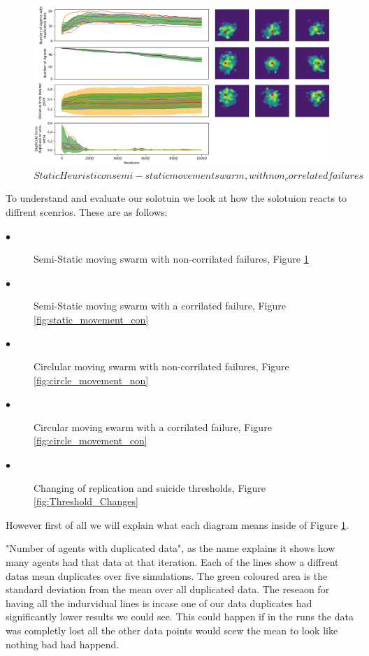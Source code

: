 \documentclass{UoYCSproject}
\begin{document}
\begin{figure}[htb]
\label{fig:static_movement_non}
\begin{center}
\centering
\includegraphics[width=\linewidth]{"./Static_Heuristic/static_movement_non.png"}
\caption{$Static Heuristic on semi-static movement swarm, with non_correlated failures$}
\end{center}
\end{figure}

To understand and evaluate our solotuin we look at how the solotuion reacts to diffrent scenrios.
These are as follows:

\begin{description}
\item[$\bullet$] Semi-Static moving swarm with non-corrilated failures, Figure \ref{fig:static_movement_non}
\item[$\bullet$] Semi-Static moving swarm with a corrilated failure, Figure \ref{fig:static_movement_con}
\item[$\bullet$] Circlular moving swarm with non-corrilated failures, Figure \ref{fig:circle_movement_non}
\item[$\bullet$] Circular moving swarm with a corrilated failure, Figure \ref{fig:circle_movement_con}
\item[$\bullet$] Changing of replication and suicide thresholds, Figure \ref{fig:Threshold_Changes}
\end{description}

However first of all we will explain what each diagram means inside of Figure \ref{fig:static_movement_non}.

"Number of agents with duplicated data", as the name explains it shows how many agents had that data at that iteration.
Each of the lines show a diffrent datas mean duplicates over five simulations.
The green coloured area is the standard deviation from the mean over all duplicated data.
The reseaon for having all the indurvidual lines is incase one of our data duplicates had significantly lower results we could see.
This could happen if in the runs the data was completly lost all the other data points would scew the mean to look like nothing bad had happend.
\end{document}
